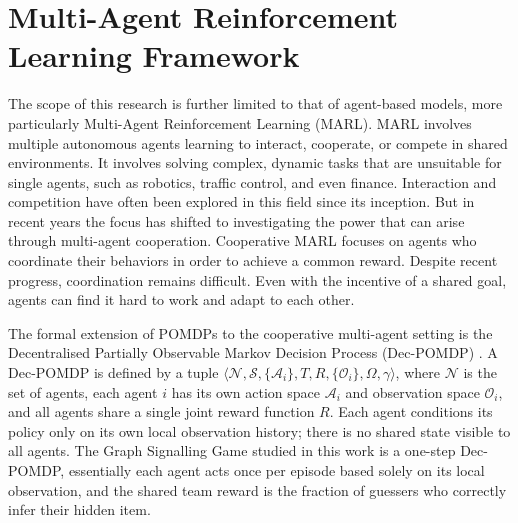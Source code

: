 \documentclass[a4paper,twoside,12pt]{report}
\begin{document}
    \section*{Multi-Agent Reinforcement Learning Framework}
    \label{sec:marl}
    The scope of this research is further limited to that of agent-based models, more particularly Multi-Agent Reinforcement Learning (MARL). MARL involves multiple autonomous agents learning to interact, cooperate, or compete in shared environments. It involves solving complex, dynamic tasks that are unsuitable for single agents, such as robotics, traffic control, and even finance. Interaction and competition have often been explored in this field since its inception. But in recent years the focus has shifted to investigating the power that can arise through multi-agent cooperation. Cooperative MARL focuses on agents who coordinate their behaviors in order to achieve a common reward. Despite recent progress, coordination remains difficult. Even with the incentive of a shared goal, agents can find it hard to work and adapt to each other.
    \newline
    
    The formal extension of POMDPs to the cooperative multi-agent setting is the
    Decentralised Partially Observable Markov Decision Process (Dec-POMDP)
    \citep{bernstein2002}. A Dec-POMDP is defined by a tuple $\langle \mathcal{N},
    \mathcal{S}, \{\mathcal{A}_i\}, T, R, \{\mathcal{O}_i\}, \Omega, \gamma
    \rangle$, where $\mathcal{N}$ is the set of agents, each agent $i$ has its own
    action space $\mathcal{A}_i$ and observation space $\mathcal{O}_i$, and all
    agents share a single joint reward function $R$. Each agent conditions its
    policy only on its own local observation history; there is no shared state
    visible to all agents. The Graph Signalling Game studied in this work is a one-step Dec-POMDP, essentially each
    agent acts once per episode based solely on its local observation, and the
    shared team reward is the fraction of guessers who correctly infer their hidden item.
    \newline
    
\end{document}
